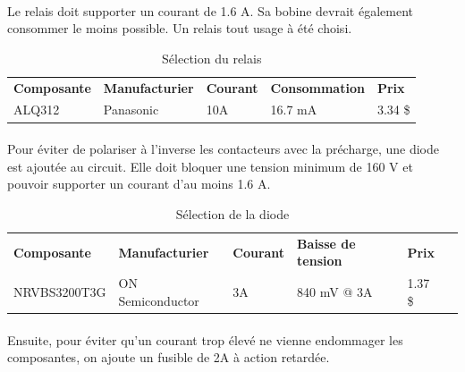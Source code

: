 		\paragraph*{}		
		Le relais doit supporter un courant de 1.6 A. Sa bobine devrait également consommer le moins possible. Un relais tout usage à été choisi.
		
		\begin{table}[H]
			\centering
			\caption{Sélection du relais}
			\label{RelaisPrecharge}
			\renewcommand{\arraystretch}{1.3}
			\begin{tabular}{|p{3cm}|p{3cm}|p{3cm}|p{3cm}|p{3cm}|}
				\hline
				\textbf{Composante} & \textbf{Manufacturier} &  \textbf{Courant} & \textbf{Consommation} & \textbf{Prix}
				\\ \hhline{|=|=|=|=|=|}
				ALQ312 & Panasonic & 10A & 16.7 mA & 3.34 \$ \\ \hline		
			\end{tabular}
		\end{table}				
		
	
		\paragraph*{}	
		Pour éviter de polariser à l'inverse les contacteurs avec la précharge, une diode est ajoutée au circuit. Elle doit bloquer une tension minimum de 160 V et pouvoir supporter un courant d'au moins 1.6 A. 
		
		\begin{table}[H]
			\centering
			\caption{Sélection de la diode}
			\label{DiodePrecharge}
			\renewcommand{\arraystretch}{1.3}
			\begin{tabular}{|p{3cm}|p{3cm}|p{3cm}|p{3cm}|p{3cm}|p{3cm}|}
				\hline
				\textbf{Composante} & \textbf{Manufacturier} & \textbf{Courant} &  \textbf{Baisse de tension} & \textbf{Prix}
				\\ \hhline{|=|=|=|=|=|=|}
				NRVBS3200T3G & ON Semiconductor & 3A & 840 mV @ 3A & 1.37 \$ \\ \hline		
			\end{tabular}
		\end{table}				
		
		\paragraph*{}			
		Ensuite, pour éviter qu'un courant trop élevé ne vienne endommager les composantes, on ajoute un fusible de 2A à action retardée. 
		

